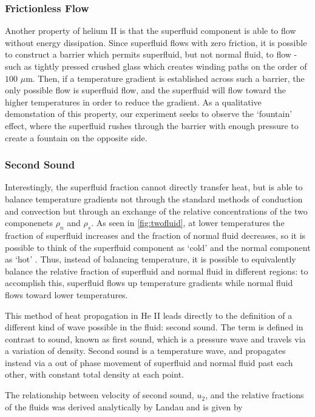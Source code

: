 \subsubsection{Frictionless Flow}
Another property of helium II is that the superfluid component is able
to flow without energy dissipation. Since superfluid flows with zero
friction, it is possible to construct a barrier which permits
superfluid, but not normal fluid, to flow - such as tightly pressed
crushed glass which creates winding paths on the order of $100$
$\mu$m. Then, if a temperature gradient is established across such a
barrier, the only possible flow is superfluid flow, and the superfluid
will flow toward the higher temperatures in order to reduce the
gradient. As a qualitative demonstation of this property, our
experiment seeks to observe the `fountain' effect, where the
superfluid rushes through the barrier with enough pressure to create a
fountain on the opposite side.

\subsubsection{Second Sound}
Interestingly, the superfluid fraction cannot directly transfer heat,
but is able to balance temperature gradients not through the standard
methods of conduction and convection but through an exchange of the
relative concentrations of the two componenets $\rho_n$ and
$\rho_s$. As seen in \ref{fig:twofluid}, at lower temperatures the
fraction of superfluid increases and the fraction of normal fluid
decreases, so it is possible to think of the superfluid component as
`cold' and the normal component as `hot' \cite{atkins}. Thus, instead
of balancing temperature, it is possible to equivalently balance the
relative fraction of superfluid and normal fluid in different
regions: to accomplish this, superfluid flows up temperature gradients while normal fluid
flows toward lower temperatures.

This method of heat propagation in He II leads directly to the
definition of a different kind of wave possible in the fluid: second
sound. The term is defined in contrast to sound, known as first sound,
which is a pressure wave and travels via a variation of
density. Second sound is a temperature wave, and propagates instead
via a out of phase movement of superfluid and normal fluid past each
other, with constant total density at each point.

The relationship between velocity of second sound, $u_2$, and the
relative fractions of the fluids was derived analytically by Landau
and is given by

